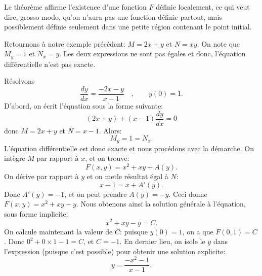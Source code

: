 Le théorème affirme l'existence d'une fonction $F$ \og{}définie localement\fg{}, ce qui veut dire, grosso modo,
qu'on n'aura pas une fonction définie partout, mais possiblement définie seulement dans une petite région contenant le point initial.

Retournons à notre exemple précédent: $M = 2x + y$ et $N = xy$.
On note que $M_y = 1$ et  $N_x = y$.
Les deux expressions ne sont pas égales et donc, l'équation différentielle n'est pas exacte.

\begin{example}
	Résolvons
	\begin{equation*}
		\frac{dy}{dx} = \frac{-2x-y}{x-1} \quad , \qquad y(0) = 1.
	\end{equation*}
	D'abord, on écrit l'équation sous la forme suivante:
	\begin{equation*}
		(2x+y) + (x-1)\frac{dy}{dx} = 0
	\end{equation*}
	donc $M = 2x+y$ et $N = x-1$.  Alors:
	\begin{equation*}
		M_y = 1 = N_x .
	\end{equation*}
	L'équation différentielle est donc exacte et nous procédons avec la démarche.
	On intègre $M$ par rapport à $x$, et on trouve:
	\begin{equation*}
		F(x,y) = x^2+xy + A(y) .
	\end{equation*}
	On dérive par rapport à $y$ et on metle résultat égal à $N$:
	\begin{equation*}
		x-1 = x + A'(y) .
	\end{equation*}
	Donc $A'(y) = -1$, et on peut prendre $A(y) = -y$.  Ceci donne $F(x,y) = x^2+xy-y$.
	Nous obtenons ainsi la solution générale à l'équation, sous forme implicite:
	\begin{equation*}
		x^2+xy-y = C.
	\end{equation*}
	On calcule maintenant la valeur de $C$: puisque $y(0)=1$, on a que
	$F(0,1) = C$.  Donc $0^2+0\times 1 - 1 = C$, et $C=-1$.
	En dernier lieu, on isole le $y$ dans l'expression (puisque c'est possible) pour obtenir une solution explicite:
	\begin{equation*}
		y = \frac{-x^2-1}{x-1} .
	\end{equation*}
\end{example}

